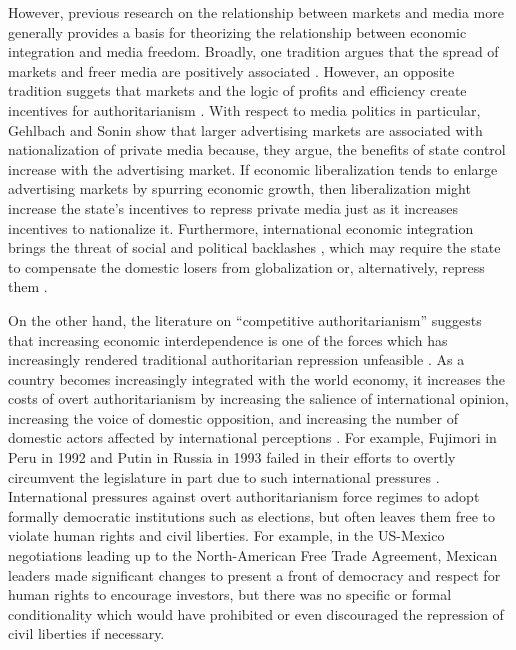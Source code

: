 \documentclass[12pt,a4paper]{article}
\begin{document}
However, previous research on the relationship between markets and media more generally provides a basis for theorizing the relationship between economic integration and media freedom. Broadly, one tradition argues that the spread of markets and freer media are positively associated \parencites{Habermas:1991vg}{Islam:2002uc}{Islam:2003tu}. However, an opposite tradition suggets that markets and the logic of profits and efficiency create incentives for authoritarianism \parencite{Huntington:1975vt}. With respect to media politics in particular, Gehlbach and Sonin \parencite*{Gehlbach:2011ky} show that larger advertising markets are associated with nationalization of private media because, they argue, the benefits of state control increase with the advertising market. If economic liberalization tends to enlarge advertising markets by spurring economic growth, then liberalization might increase the state's incentives to repress private media just as it increases incentives to nationalize it. Furthermore, international economic integration brings the threat of social and political backlashes \parencite{Bussmann:2007vx}, which may require the state to compensate the domestic losers from globalization \parencite{Rodrik:1998te} or, alternatively, repress them \parencite{Adsera:2002vt}.

On the other hand, the literature on ``competitive authoritarianism'' suggests that increasing economic interdependence is one of the forces which has increasingly rendered traditional authoritarian repression unfeasible \parencite[60, 62]{Levitsky:2002gx}. As a country becomes increasingly integrated with the world economy, it increases the costs of overt authoritarianism by increasing the salience of international opinion, increasing the voice of domestic opposition, and increasing the number of domestic actors affected by international perceptions \parencite{Levitsky:2006ex}. For example, Fujimori in Peru in 1992 and Putin in Russia in 1993 failed in their efforts to overtly circumvent the legislature in part due to such international pressures \parencite[56]{Levitsky:2002gx}. International pressures against overt authoritarianism force regimes to adopt formally democratic institutions such as elections, but often leaves them free to violate human rights and civil liberties. For example, in the US-Mexico negotiations leading up to the North-American Free Trade Agreement, Mexican leaders made significant changes to present a front of democracy and respect for human rights to encourage investors, but there was no specific or formal conditionality which would have prohibited or even discouraged the repression of civil liberties if necessary.
\end{document}
